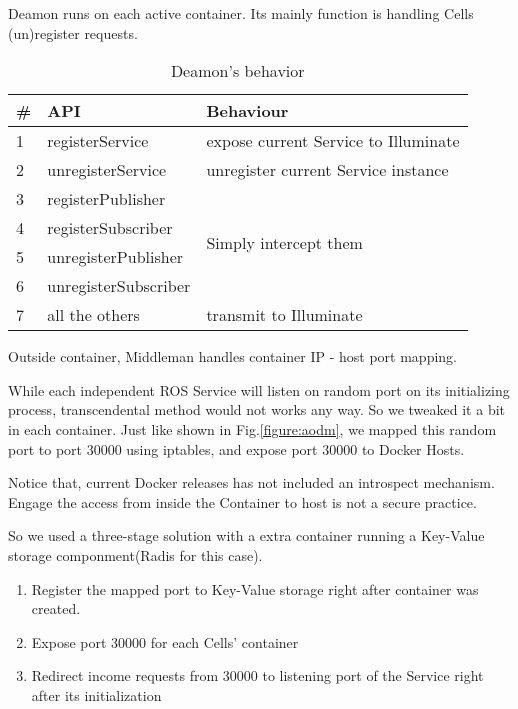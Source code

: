 Deamon runs on each active container.
Its mainly function is handling Cells (un)register requests.
\begin{table}[H]
  \renewcommand{\arraystretch}{1.3}
  \caption{Deamon's behavior}
  \label{table:demans-behavior}
  \centering
  \begin{tabular}{|l|l|l|}
     \hline
     \bfseries \# & \bfseries API & \bfseries Behaviour \\
     \hline
     1 & registerService & expose current Service to Illuminate\\
     \hline
     2 & unregisterService & unregister current Service instance \\
     \hline
     3 & registerPublisher & \multirow{4}{*}{Simply intercept them} \\
     \cline{1-2}
     4 & registerSubscriber    &  \\
     \cline{1-2}
     5 & unregisterPublisher   &  \\
     \cline{1-2}
     6 & unregisterSubscriber  &  \\
     \hline
     7 & all the others & transmit to Illuminate \\
     \hline
  \end{tabular}
\end{table}

Outside container, Middleman handles container IP - host port mapping.

While each independent ROS Service will listen on random port on its
initializing process, transcendental method would not works any way. 
So we tweaked it a bit in each container.
Just like shown in Fig.\ref{figure:aodm}, we mapped this random port to
port 30000 using iptables, and expose port 30000 to Docker Hosts.

Notice that, current Docker releases has not included an introspect mechanism.
Engage the access from inside the Container to host is not a secure practice.

So we used a three-stage solution with a extra container running a Key-Value storage componment(Radis for this case).
\begin{enumerate}
    \item Register the mapped port to Key-Value storage right after container was created.
    \item Expose port 30000 for each Cells' container
    \item Redirect income requests from 30000 to listening port of the Service right after its initialization
\end{enumerate}

